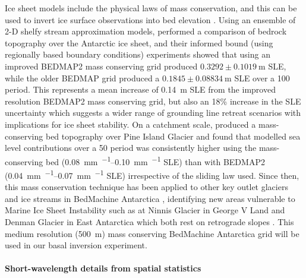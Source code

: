 Ice sheet models include the physical laws of mass conservation, and this can be used to invert ice surface observations into bed elevation \citep[e.g.][]{Morlighemmassconservationapproach2011}.
Using an ensemble of 2-D shelfy stream approximation \citep[SSA;][]{MacAyealLargescaleiceflow1989} models, \citet{SchlegelExplorationAntarcticIce2018} performed a comparison of bedrock topography over the Antarctic ice sheet, and their informed bound (using regionally based boundary conditions) experiments showed that using an improved BEDMAP2 mass conserving grid \citep[cf.][]{RignotWidespreadrapidgrounding2014} produced $0.3292\pm\SI{0.1019}{\metre}$ \gls{SLE}, while the older BEDMAP \citep{LytheBEDMAPnewice2001} grid produced a $0.1845\pm\SI{0.08834}{\metre}$ \gls{SLE} over a \SI{100}{\year} period.
This represents a mean increase of \SI{0.14}{m} \gls{SLE} from the improved resolution BEDMAP2 mass conserving grid, but also an 18\% increase in the \gls{SLE} uncertainty which suggests a wider range of grounding line retreat scenarios with implications for ice sheet stability.
On a catchment scale, \citet{NiasNewMassConserving2018} produced a mass-conserving bed topography over Pine Island Glacier and found that modelled sea level contributions over a \SI{50}{\year} period was consistently higher using the mass-conserving bed (\SIrange{0.08}{0.10}{\milli\metre\per\year} \gls{SLE}) than with BEDMAP2 (\SIrange{0.04}{0.07}{\milli\metre\per\year} \gls{SLE}) irrespective of the sliding law used.
Since then, this mass conservation technique has been applied to other key outlet glaciers and ice streams in BedMachine Antarctica \citep{MorlighemMEaSUREsBedMachineAntarctica2020}, identifying new areas vulnerable to Marine Ice Sheet Instability such as at Ninnis Glacier in George V Land and Denman Glacier in East Antarctica which both rest on retrograde slopes \citep{MorlighemDeepglacialtroughs2019}.
This medium resolution (\SI{500}{\metre}) mass conserving BedMachine Antarctica grid \citep[version 2,][]{MorlighemMEaSUREsBedMachineAntarctica2020} will be used in our basal inversion experiment.

\paragraph{Short-wavelength details from spatial statistics}

